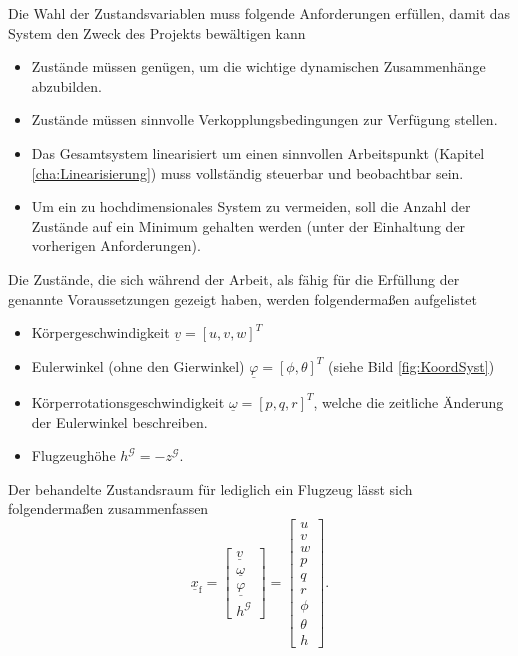 Die Wahl der Zustandsvariablen muss folgende Anforderungen erfüllen, damit das System den Zweck des Projekts bewältigen kann
\begin{itemize}
\item Zustände müssen genügen, um die wichtige dynamischen Zusammenhänge abzubilden. 
\item Zustände müssen sinnvolle Verkopplungsbedingungen zur Verfügung stellen.
\item Das Gesamtsystem linearisiert um einen sinnvollen Arbeitspunkt (Kapitel \ref{cha:Linearisierung}) muss vollständig steuerbar und beobachtbar sein.
\item Um ein zu hochdimensionales System zu vermeiden, soll die Anzahl der Zustände auf ein Minimum gehalten werden (unter der Einhaltung der vorherigen Anforderungen). 
\end{itemize}
Die Zustände, die sich während der Arbeit, als fähig für die Erfüllung der genannte Voraussetzungen gezeigt haben, werden folgendermaßen aufgelistet
\begin{itemize}
\item Körpergeschwindigkeit $\underline{v} = [u, v, w]^T$
\item Eulerwinkel (ohne den Gierwinkel) $\underline{\varphi} = [\phi, \theta]^T$ (siehe Bild \ref{fig:KoordSyst})
\item Körperrotationsgeschwindigkeit $\underline{\omega} = [p, q, r]^T$, welche die zeitliche Änderung der Eulerwinkel beschreiben.
\item Flugzeughöhe $h^\mathcal{G} = -z^\mathcal{G}$.
\end{itemize}
Der behandelte Zustandsraum für lediglich ein Flugzeug lässt sich folgendermaßen zusammenfassen\\
\begin{equation}
\underline{x}_\mathrm{f} = \begin{bmatrix} 
\underline{v} \\
\underline{\omega} \\
\underline{\varphi}\\
h^\mathcal{G}
\end{bmatrix} = \begin{bmatrix} 
u\\v\\w\\p\\q\\r\\ \phi\\ \theta\\ h
\end{bmatrix}.
\end{equation}

